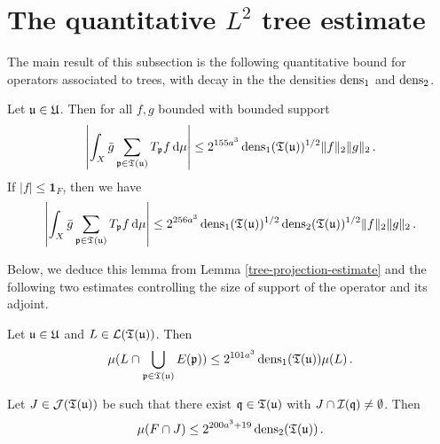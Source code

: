 {\section{The quantitative \texorpdfstring{$L^2$}{L2} tree estimate}

The main result of this subsection is the following quantitative bound for operators associated to trees, with decay in the the densities $\operatorname{\operatorname{dens}}_1$ and $\operatorname{\operatorname{dens}}_2$.

\begin{lemma}
    \label{densities-tree-bound}
    Let ${\mathfrak u} \in {\mathfrak U}$. Then for all $f,g$ bounded with bounded support
    \begin{equation}
        \label{eq-cor-tree-est}
        \left|\int_X \bar g \sum_{{\mathfrak p} \in {\mathfrak T}({\mathfrak u})} T_{{\mathfrak p} }f \, \mathrm{d}\mu \right| \le  2^{155a^3} \operatorname{\operatorname{dens}}_1({\mathfrak T}({\mathfrak u}))^{1/2} \|f\|_2\|g\|_2\,.
    \end{equation}
    If $|f| \le \mathbf{1}_F$, then we have
    \begin{equation}
        \label{eq-cor-tree-est-F}
        \left| \int_X \bar g \sum_{{\mathfrak p} \in {\mathfrak T}({\mathfrak u})} T_{{\mathfrak p} }f\, \mathrm{d}\mu \right| \le  2^{256a^3} \operatorname{\operatorname{dens}}_1({\mathfrak T}({\mathfrak u}))^{1/2} \operatorname{\operatorname{dens}}_2({\mathfrak T}({\mathfrak u}))^{1/2} \|f\|_2\|g\|_2\,.
    \end{equation}
\end{lemma}

Below, we deduce this lemma from  Lemma \ref{tree-projection-estimate} and the following two estimates controlling the size of support of the operator and its adjoint.

\begin{lemma}
    \label{local-dens1-tree-bound}
    Let ${\mathfrak u} \in {\mathfrak U}$ and $L \in \mathcal{L}({\mathfrak T}({\mathfrak u}))$. Then
    \begin{equation}
    \label{eq-1density-estimate-tree}
        \mu(L \cap \bigcup_{{\mathfrak p} \in {\mathfrak T}({\mathfrak u})} E({\mathfrak p})) \le 2^{101a^3} \operatorname{\operatorname{dens}}_1({\mathfrak T}({\mathfrak u})) \mu(L)\,.
    \end{equation}
\end{lemma}

\begin{lemma}
    \label{local-dens2-tree-bound}
    Let $J \in \mathcal{J}({\mathfrak T}({\mathfrak u}))$ be such that there exist ${\mathfrak q} \in {\mathfrak T}({\mathfrak u})$ with $J \cap {\mathcal{I}}({\mathfrak q}) \ne \emptyset$. Then
    $$
        \mu(F \cap J) \le 2^{200a^3 + 19} \operatorname{\operatorname{dens}}_2({\mathfrak T}({\mathfrak u}))\,.
    $$
\end{lemma}

}
